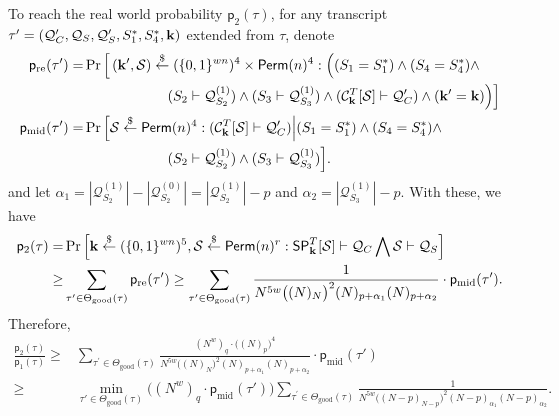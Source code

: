 To reach the real world probability $\mathsf{p}_2(\tau)$, for any transcript $\tau'=(\mathcal{Q}_{C}',\mathcal{Q}_{S},\mathcal{Q}_{S}',S_1^*,S_4^*,\mathbf{k})$ extended from $\tau$, denote            {\small
%
%
\begin{align}
\mathsf{p}_{\mathrm{re}}(\tau') = & \operatorname{Pr}\Big[\left(\mathbf{k}',\mathcal{S}\right) \stackrel{\$}{\leftarrow} (\{0,1\}^{wn})^4 \times \mathsf{Perm}(n)^4:
\Big((S_1=S_1^*)\wedge (S_4=S_4^*)\wedge		\notag 	\\
&\codeindent\codeindent\codeindent\codeindent\codeindent\codeindent\codeindent\codeindent\codeindent (S_2\vdash\mathcal{Q}_{S_2}^{(1)})\wedge (S_3\vdash\mathcal{Q}_{S_3}^{(1)})\wedge (\calC_{\bfk}^T[\calS] \vdash \mathcal{Q}_C')\wedge(\bfk'=\bfk)\Big)\Big]\\
\mathsf{p}_{\mathrm{mid}}(\tau') = & \operatorname{Pr}\Big[\mathcal{S} \stackrel{\$}{\leftarrow}\mathsf{Perm}(n)^4:(\calC_{\bfk}^T[\calS] \vdash \mathcal{Q}_C')\Big|
%
(S_1=S_1^*)\wedge (S_4=S_4^*)\wedge	 	\notag 	\\
&\codeindent\codeindent\codeindent\codeindent\codeindent\codeindent\codeindent\codeindent\codeindent (S_2\vdash\mathcal{Q}_{S_2}^{(1)})\wedge (S_3\vdash\mathcal{Q}_{S_3}^{(1)})\Big].
\end{align}
}%
%
%
and let $\alpha_1=|\mathcal{Q}_{S_2}^{(1)}|-|\mathcal{Q}_{S_2}^{(0)}|=|\mathcal{Q}_{S_2}^{(1)}|-p$ and $\alpha_2=|\mathcal{Q}_{S_3}^{(1)}|-p$. With these, we have
%
%
\begin{align*}
\mathsf{p}_2(\tau)=&\operatorname{Pr}\left[\bfk \stackrel{\$}{\leftarrow} (\{0,1\}^{wn})^5, \mathcal{S} \stackrel{\$}{\leftarrow} \mathsf{Perm}(n)^{r}:\spn_{\bfk}^{T}[\mathcal{S}] \vdash \mathcal{Q}_{C} \bigwedge \mathcal{S} \vdash \mathcal{Q}_{S}\right]		\\
\geq & \sum_{\tau^{\prime} \in \Theta_{\mathrm{good}}(\tau)} \mathsf{p}_{\mathrm{re}}(\tau')  
\geq
\sum_{\tau^{\prime} \in \Theta_{\mathrm{good}}(\tau)}
%
\frac{1}{N^{5w}\big((N)_{N}\big)^2(N)_{p+\alpha_1}(N)_{p+\alpha_2}}\cdot \mathsf{p}_{\mathrm{mid}}(\tau')  .
\end{align*}
%
%
Therefore,
%
%
\begin{align*}
\frac{\mathsf{p}_{2}(\tau)}{\mathsf{p}_{1}(\tau)}   \geq  &
\sum_{\tau^{\prime} \in \Theta_{\mathrm{good}}(\tau)}
\frac{(N^w)_q\cdot\big((N)_p\big)^4}{N^{5w}\big((N)_{N}\big)^2(N)_{p+\alpha_1}(N)_{p+\alpha_2}}\cdot \mathsf{p}_{\mathrm{mid}}(\tau')         \\
\geq  &    \min_{\tau' \in \Theta_{\mathrm{good}}(\tau)}\big((N^w)_q\cdot\mathsf{p}_{\mathrm{mid}}(\tau')\big)
\sum_{\tau^{\prime} \in \Theta_{\mathrm{good}}(\tau)}
\frac{1}{N^{5w}\big((N-p)_{N-p}\big)^2(N-p)_{\alpha_1}(N-p)_{\alpha_2}}   .
\end{align*}


